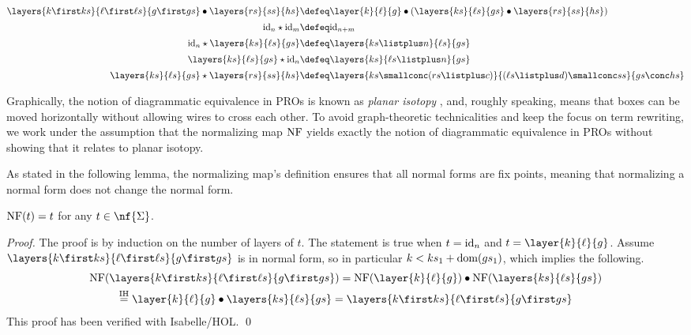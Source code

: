 \begin{definition}
\begin{align*}
        \layers{k\first ks}{\ell \first \ell s}{g \first gs}\bullet \layers{rs}{ss}{hs}&\defeq \layer{k}{\ell}{g}\bullet   (\layers{ks}{\ell s}{gs}\bullet \layers{rs}{ss}{hs})\\[0.2em]
        \textup{id}_n \star \textup{id}_m &\defeq \textup{id}_{n+m}\\[0.2em]
        \textup{id}_n \star \layers{ks}{\ell s}{gs} &\defeq \layers{ks\listplus n}{\ell s}{gs} \\[0.2em]
        \layers{ks}{\ell s}{gs}  \star  \textup{id}_n&\defeq \layers{ks}{\ell s\listplus n}{gs} \\[0.2em]
        \layers{ks}{\ell s}{gs}\star \layers{rs}{ss}{hs}&\defeq \layers{ks\smallconc (rs\listplus c)}{(\ell s\listplus d )\smallconc  ss}{gs \conc hs}
    \end{align*}
\end{definition}

Graphically, the notion of diagrammatic equivalence in PROs is known as \emph{planar isotopy} \cite[Theorem~3.1]{selingerbible}, and, roughly speaking, means that boxes can be moved horizontally without allowing wires to cross each other. To avoid graph-theoretic technicalities and keep the focus on term rewriting, we work under the assumption that the normalizing map $\textup{NF}$ yields exactly the notion of diagrammatic equivalence in PROs without showing that it relates to planar isotopy.

As stated in the following lemma, the normalizing map's definition ensures that all normal forms are fix points, meaning that normalizing a normal form does not change the normal form.
\begin{lemma}\label{lem:nfnfterm}
    $\textup{NF}(t)=t$ for any $t\in \nf{\Sigma}$.
\end{lemma}

\begin{proof} The proof is by induction on the number of layers of $t$. The statement is true when $t=\textup{id}_n$ and $t=\layer{k}{\ell}{g}$. Assume $\layers{k\first ks}{\ell \first \ell s}{g\first gs}$ is in normal form, so in particular $k<ks_1+\textup{dom}(gs_1)$, which implies the following.
\begin{multline*}
    \textup{NF}(\layers{k\first ks}{\ell \first \ell s}{g\first gs}) = \textup{NF}(\layer{k}{\ell}{g})\bullet \textup{NF}(\layers{ks}{\ell s}{gs}) \\
    \overset{\textup{IH}}{=} \layer{k}{\ell}{g}\bullet \layers{ks}{\ell s}{gs} = \layers{k\first ks}{\ell \first \ell s} {g\first gs}
\end{multline*}
This proof has been verified with Isabelle/HOL. \qed
\end{proof}

